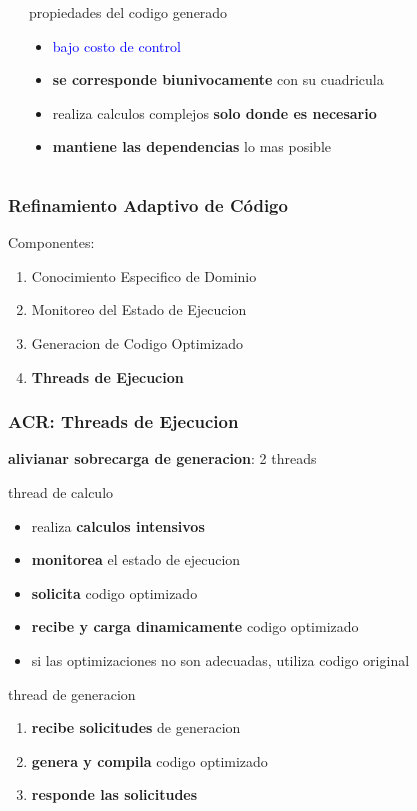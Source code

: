 \documentclass{beamer}\usetheme{Madrid} %
\begin{document}
\begin{frame}
\begin{columns}
\begin{center}
\end{center}
\begin{block}{propiedades del codigo generado}
\begin{itemize}
\item \textcolor{blue}{bajo costo de control}
\item \textbf{se corresponde biunivocamente} con su cuadricula
\item realiza calculos complejos \textbf{solo donde es necesario}
\item \textbf{mantiene las dependencias} lo mas posible
\end{itemize}
\end{block}
\end{columns}
\end{frame}
\begin{frame}
\frametitle{Refinamiento Adaptivo de Código}
Componentes:
\begin{enumerate}
\item Conocimiento Especifico de Dominio
\item Monitoreo del Estado de Ejecucion
\item Generacion de Codigo Optimizado
\item \textbf{Threads de Ejecucion}
\end{enumerate}
\end{frame}
\begin{frame}
\frametitle{ACR: Threads de Ejecucion}
\begin{block}{}
\textbf{alivianar sobrecarga de generacion}: 2 threads
\end{block}
\begin{block}{thread de calculo}
\begin{itemize}
		\item realiza \textbf{calculos intensivos}
		\item \textbf{monitorea} el estado de ejecucion
		\item \textbf{solicita} codigo optimizado
		\item \textbf{recibe y carga dinamicamente} codigo optimizado
		\item si las optimizaciones no son adecuadas, utiliza codigo original
\end{itemize}
\end{block}
\begin{block}{thread de generacion}
	\begin{enumerate}
		\item \textbf{recibe solicitudes} de generacion
		\item \textbf{genera y compila} codigo optimizado
		\item \textbf{responde las solicitudes}
	\end{enumerate}
\end{block}
\end{frame}
\end{document}
